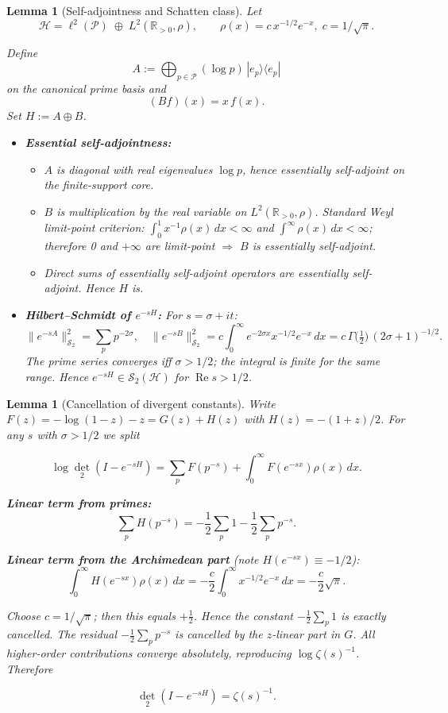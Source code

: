 \documentclass[11pt,a4paper]{article}
\newtheorem{lemma}[theorem]{Lemma}
\theoremstyle{definition}
\theoremstyle{remark}
\newcommand{\R}{\mathbb{R}}
\newcommand{\calP}{\mathcal{P}}
\newcommand{\calS}{\mathcal{S}}
\newcommand{\calH}{\mathcal{H}}
\DeclareMathOperator{\det}{det}
\DeclareMathOperator{\Re}{Re}
\begin{document}
\begin{lemma}[Self-adjointness and Schatten class]\label{lem:hybrid-self}
Let  
\[
\calH = \ell^{2}(\calP)\;\oplus\;L^{2}(\R_{>0},\rho),\qquad\rho(x)=c\,x^{-1/2}e^{-x},\; c=1/\sqrt\pi .
\]

Define  
\[
A:=\bigoplus_{p\in\calP}(\log p)\,|e_p\rangle\langle e_p|
\]
on the canonical prime basis and  
\[
(Bf)(x)=x\,f(x).
\]
Set $H:=A\oplus B$.

\begin{itemize}
\item \textbf{Essential self-adjointness:}  
  \begin{itemize}
  \item $A$ is diagonal with real eigenvalues $\log p$, hence essentially self-adjoint on the finite-support core.  
  \item $B$ is multiplication by the real variable on $L^{2}(\R_{>0},\rho)$.  Standard Weyl limit-point criterion:  
     $\int_{0}^{1}x^{-1}\rho(x)\,dx<\infty$ and $\int^{\infty}\rho(x)\,dx<\infty$; therefore 0 and $+\infty$ are limit-point $\Rightarrow$ $B$ is essentially self-adjoint.  
  \item Direct sums of essentially self-adjoint operators are essentially self-adjoint.  Hence $H$ is.
  \end{itemize}

\item \textbf{Hilbert--Schmidt of $e^{-sH}$:}  
  For $s=\sigma+it$:
  \[
  \|e^{-sA}\|_{\calS_{2}}^{2}=\sum_{p}p^{-2\sigma},\quad
  \|e^{-sB}\|_{\calS_{2}}^{2}=c\!\int_{0}^{\infty} e^{-2\sigma x}x^{-1/2}e^{-x}\,dx
  =c\,\Gamma\!\bigl(\tfrac12\bigr)\,(2\sigma+1)^{-1/2}.
  \]
  The prime series converges iff $\sigma>1/2$; the integral is finite for the same range.  
  Hence $e^{-sH}\in\calS_2(\calH)$ for $\Re s>1/2$.
\end{itemize}
\end{lemma}

\begin{lemma}[Cancellation of divergent constants]\label{lem:cancel}
Write $F(z)=-\log(1-z)-z=G(z)+H(z)$ with $H(z)=-(1+z)/2$.  
For any $s$ with $\sigma>1/2$ we split

\[
\log\det_2(I-e^{-sH})
=\sum_{p}F(p^{-s})+\int_{0}^{\infty}F(e^{-sx})\rho(x)\,dx.
\]

\textbf{Linear term from primes:}
\[
\sum_{p}H(p^{-s})=-\frac12\sum_{p}1-\frac12\sum_{p}p^{-s}.
\]

\textbf{Linear term from the Archimedean part} (note $H(e^{-sx})\equiv-1/2$):
\[
\int_{0}^{\infty}H(e^{-sx})\rho(x)\,dx=-\frac{c}{2}\int_{0}^{\infty}x^{-1/2}e^{-x}\,dx
=-\frac{c}{2}\sqrt{\pi}.
\]

Choose $c=1/\sqrt{\pi}$; then this equals $+\frac12$.  Hence the constant $-\frac12\sum_{p}1$ is exactly cancelled.  
The residual $-\frac12\sum_{p}p^{-s}$ is cancelled by the $z$-linear part in $G$.  All higher-order contributions converge absolutely, reproducing $\log\zeta(s)^{-1}$.  Therefore

\[
\det_2(I-e^{-sH})=\zeta(s)^{-1}.
\]
\end{lemma}
\end{document}
